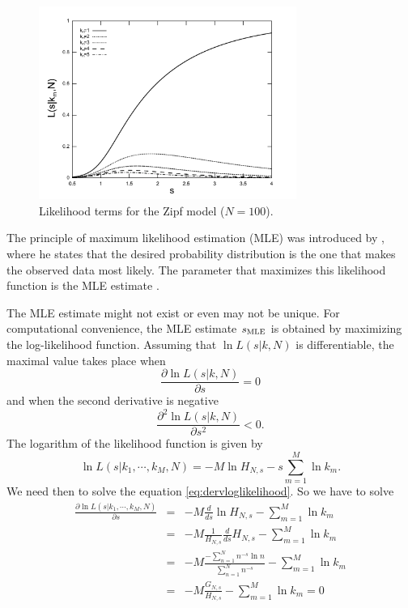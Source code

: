 \begin{figure}[h!]
\centering
\includegraphics[width=0.75\textwidth]{images/zipf_likelihood_k.pdf}
\caption{Likelihood terms for the Zipf model ($N=100$).}
\label{fig:zipf_likelihood_k}
\end{figure} 

The principle of maximum likelihood estimation (MLE) was introduced by \cite{fisher1922}, 
where he states that the desired probability distribution is the one that makes the observed data
most likely. The parameter that maximizes this likelihood function is the MLE estimate \citep{aldrich1997}.


The MLE estimate might not exist or even may not be unique. For computational convenience,
the MLE estimate $s_{\textmd{MLE}}$ is obtained by maximizing the log-likelihood function.
Assuming that $\ln L(s|k,N)$ is differentiable, the maximal value takes place when
\begin{equation}
\label{eq:dervloglikelihood}
\frac{\partial \ln L(s|k,N)}{\partial s} = 0 
\end{equation}
and when the second derivative is negative 
\begin{equation}
\frac{\partial^2 \ln L(s|k,N)}{\partial s^2} < 0 .
\end{equation}
The logarithm of the likelihood function is given by
\begin{equation}
\ln L(s|k_1,\cdots,k_M,N) = -M \ln H_{N,s} - s \sum_{m=1}^{M} \ln k_m .
\end{equation}
We need then to solve the equation \ref{eq:dervloglikelihood}. So we have to solve
\begin{eqnarray}
\label{eq:derivloglikeeqzero}
\frac{\partial \ln L(s|k_1,\cdots,k_M,N)}{\partial s} &=& - M \frac{d}{ds} \ln H_{N,s}  - \sum_{m=1}^{M} \ln k_m  \nonumber \\
	&=& -M \frac{1}{H_{N,s}} \frac{d}{ds} H_{N,s} - \sum_{m=1}^{M} \ln k_m  \nonumber \\
	&=& -M \frac{- \sum_{n=1}^{N} n^{-s} \ln n }{\sum_{n=1}^{N} n^{-s}} - \sum_{m=1}^{M} \ln k_m  \nonumber \\
	&=& -M \frac{G_{N,s}}{H_{N,s}} - \sum_{m=1}^{M} \ln k_m  = 0
\end{eqnarray}

